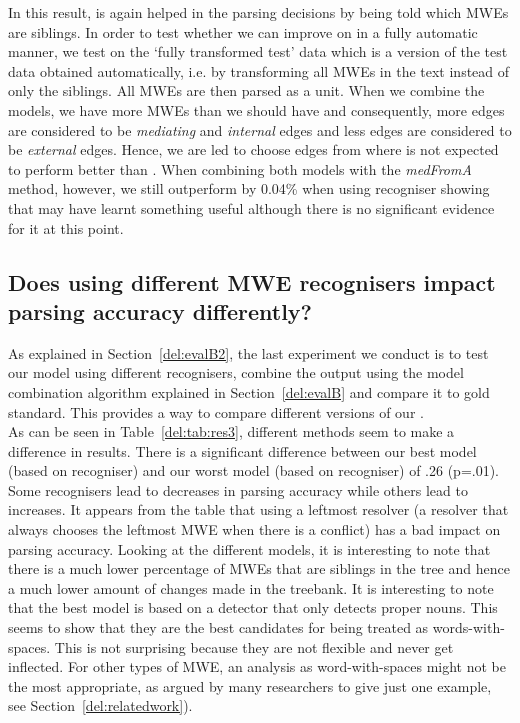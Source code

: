 \documentclass[output=paper]{langsci/langscibook}
\begin{document}
\indent In this result, {\modelB} is again helped in the parsing decisions by being told which MWEs are siblings. In order to test whether we can improve on {\modelA} in a fully automatic manner, we test {\modelB} on the `fully transformed test' data which is a version of the test data obtained automatically, i.e. by transforming all MWEs in the text instead of only the siblings. All MWEs are then parsed as a unit. When we combine the models, we have more MWEs than we should have and consequently, more edges are considered to be \textit{mediating} and \textit{internal} edges and less edges are considered to be \textit{external} edges. Hence, we are led to choose edges from {\modelA} where {\modelA} is not expected to perform better than {\modelB}. When combining both models with the \textit{medFromA} method, however, we still outperform {\modelA} by 0.04\% when using recogniser showing that {\modelB} may have learnt something useful although there is no significant evidence for it at this point. 
\subsection{Does using different MWE recognisers impact parsing accuracy differently?}
\label{del:q2}
\indent As explained in Section~\ref{del:evalB2}, the last experiment we conduct is to test our model using different recognisers, combine the output using the model combination algorithm explained in Section~\ref{del:evalB} and compare it to gold standard. This provides a way to compare different versions of our {\modelB}.\\	
\indent As can be seen in Table~\ref{del:tab:res3}, different  methods seem to make a difference in results. There is a significant difference between our best model (based on recogniser) and our worst model (based on recogniser) of .26 (p=.01). Some recognisers lead to decreases in parsing accuracy while others lead to increases. It appears from the table that using a leftmost resolver (a resolver that always chooses the leftmost MWE when there is a conflict) has a bad impact on parsing accuracy. Looking at the different models, it is interesting to note that there is a much lower percentage of MWEs that are siblings in the tree and hence a much lower amount of changes made in the treebank. It is interesting to note that the best model is based on a detector that only detects proper nouns. This seems to show that they are the best candidates for being treated as words-with-spaces. This is not surprising because they are not flexible and never get inflected. For other types of MWE, an analysis as word-with-spaces might not be the most appropriate, as argued by many researchers \citep{sag02} to give just one example, see Section~\ref{del:relatedwork}).
\end{document}
